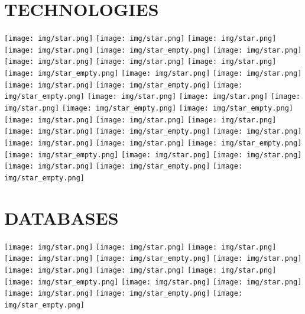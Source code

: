 \documentclass[]{cv-class}
\begin{document}
\begin{aside}
  \section{TECHNOLOGIES}
    {\texttt{[image: img/star.png]}
    \texttt{[image: img/star.png]}
    \texttt{[image: img/star.png]}
    \texttt{[image: img/star.png]}
    \texttt{[image: img/star\_empty.png]}}
    {\texttt{[image: img/star.png]}
    \texttt{[image: img/star.png]}
    \texttt{[image: img/star.png]}
    \texttt{[image: img/star.png]}
    \texttt{[image: img/star\_empty.png]}}
    {\texttt{[image: img/star.png]}
    \texttt{[image: img/star.png]}
    \texttt{[image: img/star.png]}
    \texttt{[image: img/star\_empty.png]}
    \texttt{[image: img/star\_empty.png]}}    
    {\texttt{[image: img/star.png]}
    \texttt{[image: img/star.png]}
    \texttt{[image: img/star.png]}
    \texttt{[image: img/star\_empty.png]}
    \texttt{[image: img/star\_empty.png]}}
    {\texttt{[image: img/star.png]}
    \texttt{[image: img/star.png]}
    \texttt{[image: img/star.png]}
    \texttt{[image: img/star.png]}
    \texttt{[image: img/star\_empty.png]}}
    {\texttt{[image: img/star.png]}
    \texttt{[image: img/star.png]}
    \texttt{[image: img/star.png]}
    \texttt{[image: img/star\_empty.png]}
    \texttt{[image: img/star\_empty.png]}}    
    {\texttt{[image: img/star.png]}
    \texttt{[image: img/star.png]}
    \texttt{[image: img/star.png]}
    \texttt{[image: img/star\_empty.png]}
    \texttt{[image: img/star\_empty.png]}}
    ~
      ~
  \section{DATABASES}
    {\texttt{[image: img/star.png]}
    \texttt{[image: img/star.png]}
    \texttt{[image: img/star.png]}
    \texttt{[image: img/star.png]}
    \texttt{[image: img/star\_empty.png]}}
    {\texttt{[image: img/star.png]}
    \texttt{[image: img/star.png]}
    \texttt{[image: img/star.png]}
    \texttt{[image: img/star.png]}
    \texttt{[image: img/star\_empty.png]}}
    {\texttt{[image: img/star.png]}
    \texttt{[image: img/star.png]}
    \texttt{[image: img/star.png]}
    \texttt{[image: img/star\_empty.png]}
    \texttt{[image: img/star\_empty.png]}}    
    ~
\end{aside}
\end{document}
